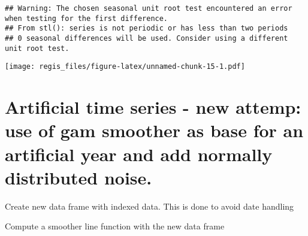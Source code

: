 \documentclass[
]{article}
\newenvironment{Shaded}{\begin{snugshade}}{\end{snugshade}}
\newcommand{\AttributeTok}[1]{\textcolor[rgb]{0.77,0.63,0.00}{#1}}
\newcommand{\DecValTok}[1]{\textcolor[rgb]{0.00,0.00,0.81}{#1}}
\newcommand{\FloatTok}[1]{\textcolor[rgb]{0.00,0.00,0.81}{#1}}
\newcommand{\FunctionTok}[1]{\textcolor[rgb]{0.00,0.00,0.00}{#1}}
\newcommand{\NormalTok}[1]{#1}
\newcommand{\OtherTok}[1]{\textcolor[rgb]{0.56,0.35,0.01}{#1}}
\newcommand{\SpecialCharTok}[1]{\textcolor[rgb]{0.00,0.00,0.00}{#1}}
\newcommand{\StringTok}[1]{\textcolor[rgb]{0.31,0.60,0.02}{#1}}
\begin{document}
\begin{verbatim}
## Warning: The chosen seasonal unit root test encountered an error when testing for the first difference.
## From stl(): series is not periodic or has less than two periods
## 0 seasonal differences will be used. Consider using a different unit root test.
\end{verbatim}

\begin{Shaded}
\end{Shaded}

\texttt{[image: regis\_files/figure-latex/unnamed-chunk-15-1.pdf]}

\hypertarget{artificial-time-series---new-attemp-use-of-gam-smoother-as-base-for-an-artificial-year-and-add-normally-distributed-noise.}{%
\section{Artificial time series - new attemp: use of gam smoother as
base for an artificial year and add normally distributed
noise.}\label{artificial-time-series---new-attemp-use-of-gam-smoother-as-base-for-an-artificial-year-and-add-normally-distributed-noise.}}

Create new data frame with indexed data. This is done to avoid date
handling

\begin{Shaded}
\end{Shaded}

Compute a smoother line function with the new data frame
\end{document}
